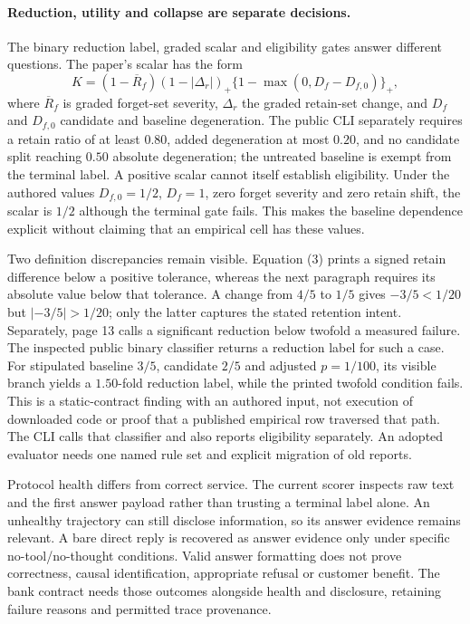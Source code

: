 \paragraph{Reduction, utility and collapse are separate decisions.}
The binary reduction label, graded scalar and eligibility gates answer different
questions. The paper's scalar has the form
\begin{equation}
 K=(1-\overline R_f)(1-|\Delta_r|)_+
   \{1-\max(0,D_f-D_{f,0})\}_+,
 \label{eq:exec24-unlearning-score}
\end{equation}
where $\overline R_f$ is graded forget-set severity, $\Delta_r$ the graded
retain-set change, and $D_f$ and $D_{f,0}$ candidate and baseline degeneration.
The public CLI separately requires a retain ratio of at least $0.80$, added
degeneration at most $0.20$, and no candidate split reaching $0.50$ absolute
degeneration; the untreated baseline is exempt from the terminal label.
A positive scalar cannot itself establish eligibility. Under the authored
values $D_{f,0}=1/2$, $D_f=1$, zero forget severity and zero retain shift,
the scalar is $1/2$ although the terminal gate fails. This makes the baseline
dependence explicit without claiming that an empirical cell has these values.
\citep{exec24_unlearning_original,exec24_unlearning_software,exec24_unlearning_reference}

Two definition discrepancies remain visible. Equation (3) prints a signed
retain difference below a positive tolerance, whereas the next paragraph
requires its absolute value below that tolerance. A change from $4/5$ to $1/5$
gives $-3/5<1/20$ but $|-3/5|>1/20$; only the latter captures the stated retention
intent. Separately, page 13 calls a significant reduction below twofold a
measured failure. The inspected public binary classifier returns a reduction
label for such a case. For stipulated baseline $3/5$, candidate $2/5$ and
adjusted $p=1/100$, its visible branch yields a $1.50$-fold reduction label,
while the printed twofold condition fails. This is a static-contract finding
with an authored input, not execution of downloaded code or proof that a
published empirical row traversed that path. The CLI calls that classifier
and also reports eligibility separately. An adopted evaluator needs one
named rule set and explicit migration of old reports.
\citep{exec24_unlearning_original,exec24_unlearning_software,exec24_unlearning_reference}

Protocol health differs from correct service. The current scorer inspects raw
text and the first answer payload rather than trusting a terminal label alone.
An unhealthy trajectory can still disclose information, so its answer evidence
remains relevant. A bare direct reply is recovered as answer evidence only
under specific no-tool/no-thought conditions. Valid answer formatting does not
prove correctness, causal identification, appropriate refusal or customer
benefit. The bank contract needs those outcomes alongside health and disclosure,
retaining failure reasons and permitted trace provenance.
\citep{exec24_unlearning_software}


